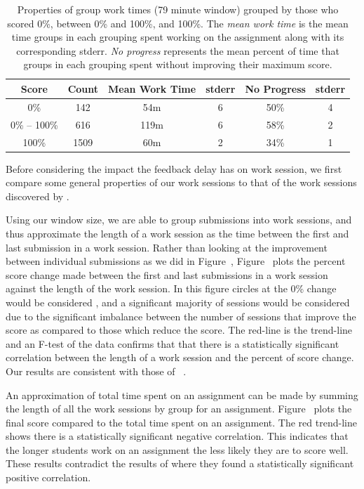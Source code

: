 \begin{table}
\centering
\begin{tabular}{|c||c|c|c|c|c|} \hline
Score & Count & Mean Work Time & stderr & No Progress & stderr \\ \hline \hline
0\% & 142 & 54m & 6 & 50\% & 4 \\ \hline
0\% -- 100\% & 616 & 119m & 6 & 58\% & 2 \\ \hline
100\% & 1509 & 60m & 2 & 34\% & 1 \\ \hline
\end{tabular}
\caption{Properties of group work times (79 minute window) grouped by those who
  scored 0\%, between 0\% and 100\%, and 100\%. The \emph{mean work time} is
  the mean time groups in each grouping spent working on the assignment along
  with its corresponding stderr. \emph{No progress} represents the mean percent
  of time that groups in each grouping spent without improving their maximum
  score.}  
\end{table}

Before considering the impact the feedback delay has on work session, we first
compare some general properties of our work sessions to that of the work
sessions discovered by \spacco{}.

Using our window size, we are able to group submissions into work sessions, and
thus approximate the length of a work session as the time between the first and
last submission in a work session. Rather than looking at the improvement
between individual submissions as we did in
Figure~, Figure~
plots the percent score change made between the first and last submissions in a
work session against the length of the work session. In this figure circles at
the 0\% change would be considered \noi{}, and a significant majority of
sessions would be considered \imp{} due to the significant imbalance between
the number of sessions that improve the score as compared to those which reduce
the score. The red-line is the trend-line and an F-test of the data confirms
that that there is a statistically significant correlation between the length
of a work session and the percent of score change. Our results are consistent
with those of \spacco{}~\cite{Spacco:2013:TIP:2462476.2465594}.

An approximation of total time spent on an assignment can be made by summing
the length of all the work sessions by group for an
assignment. Figure~ plots the final score compared to
the total time spent on an assignment. The red trend-line shows there is a
statistically significant negative correlation. This indicates that the longer
students work on an assignment the less likely they are to score well. These
results contradict the results of \spacco{} where they found a statistically
significant positive correlation.

